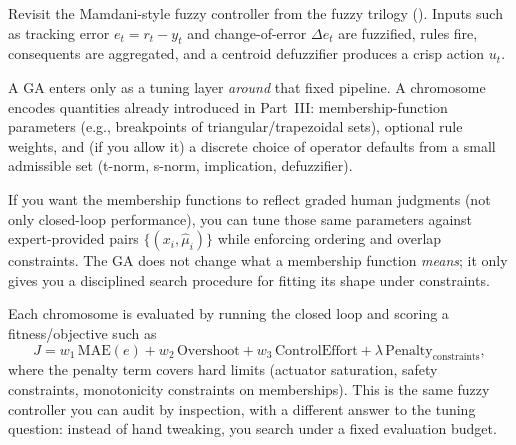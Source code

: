 \begin{tcolorbox}[summarybox, title={Application example: GA tuning of a previously built fuzzy controller}]
Revisit the Mamdani-style fuzzy controller from the fuzzy trilogy (). Inputs such as tracking error \(e_t=r_t-y_t\) and change-of-error \(\Delta e_t\) are fuzzified, rules fire, consequents are aggregated, and a centroid defuzzifier produces a crisp action \(u_t\).
\par\smallskip
A GA enters only as a tuning layer \emph{around} that fixed pipeline. A chromosome encodes quantities already introduced in Part~III: membership-function parameters (e.g., breakpoints of triangular/trapezoidal sets), optional rule weights, and (if you allow it) a discrete choice of operator defaults from a small admissible set (t\hyp{}norm, s\hyp{}norm, implication, defuzzifier).
\par\smallskip
If you want the membership functions to reflect graded human judgments (not only closed-loop performance), you can tune those same parameters against expert-provided pairs \(\{(x_i,\hat{\mu}_i)\}\) while enforcing ordering and overlap constraints. The GA does not change what a membership function \emph{means}; it only gives you a disciplined search procedure for fitting its shape under constraints.
\par\smallskip
Each chromosome is evaluated by running the closed loop and scoring a fitness/objective such as
\[
J = w_1\,\mathrm{MAE}(e) + w_2\,\mathrm{Overshoot} + w_3\,\mathrm{ControlEffort}
    + \lambda\,\mathrm{Penalty}_{\text{constraints}} ,
\]
where the penalty term covers hard limits (actuator saturation, safety constraints, monotonicity constraints on memberships). This is the same fuzzy controller you can audit by inspection, with a different answer to the tuning question: instead of hand tweaking, you search under a fixed evaluation budget.
\end{tcolorbox}

